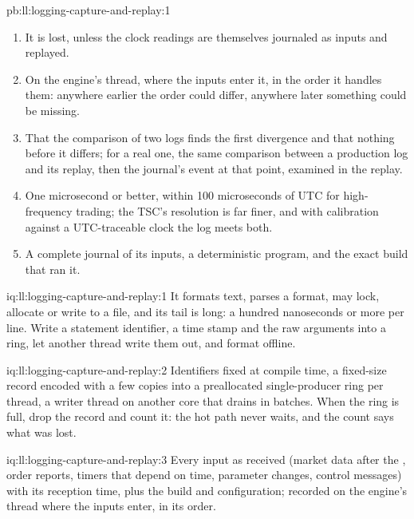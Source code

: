\begin{solution}{pb:ll:logging-capture-and-replay:1}
\begin{enumerate}
comparing the replayed decision log (or its hash) with the production log.
\item It is lost, unless the clock readings are themselves journaled as inputs and replayed.
\item On the engine's thread, where the inputs enter it, in the order it handles them: anywhere earlier the order could
differ, anywhere later something could be missing.
\item That the comparison of two logs finds the first divergence and that nothing before it differs; for a real one, the same
comparison between a production log and its replay, then the journal's event at that point, examined in the replay.
\item One microsecond or better, within 100 microseconds of UTC for high-frequency trading; the TSC's resolution is far finer,
and with calibration against a UTC-traceable clock the log meets both.
\item A complete journal of its inputs, a deterministic program, and the exact build that ran it.
\end{enumerate}
\end{solution}

\begin{solution}{iq:ll:logging-capture-and-replay:1}
It formats text, parses a format, may lock, allocate or write to a file, and its tail is long: a hundred nanoseconds or more
per line. Write a statement identifier, a time stamp and the raw arguments into a ring, let another thread write them out, and
format offline.
\end{solution}

\begin{solution}{iq:ll:logging-capture-and-replay:2}
Identifiers fixed at compile time, a fixed-size record encoded with a few copies into a preallocated single-producer ring per
thread, a writer thread on another core that drains in batches. When the ring is full, drop the record and count it: the hot
path never waits, and the count says what was lost.
\end{solution}

\begin{solution}{iq:ll:logging-capture-and-replay:3}
Every input as received (market data after the , order reports, timers that depend on time, parameter changes,
control messages) with its reception time, plus the build and configuration; recorded on the engine's thread where the inputs
enter, in its order.
\end{solution}

